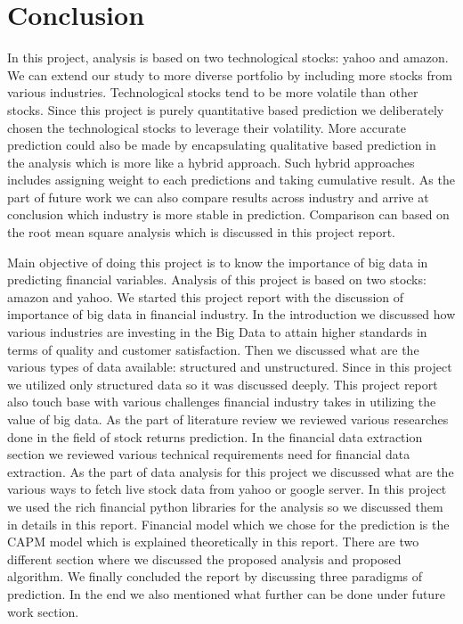 \section{Conclusion}
In this project, analysis is based on two technological stocks: yahoo and amazon. We can extend our study to more diverse portfolio by including more stocks 
from various industries. Technological stocks tend to be more volatile than other stocks. Since this project is purely quantitative based prediction we 
deliberately chosen the technological stocks to leverage their volatility. More accurate prediction could also be made by encapsulating qualitative based prediction
 in the analysis which is more like a hybrid approach. Such hybrid approaches includes assigning weight to each predictions and taking cumulative result.  
 As the part of future work we can also compare results across industry and arrive at conclusion which industry is more stable in prediction. Comparison can based on 
the root mean square analysis which is discussed in this project report.  


Main objective of doing this project is to know the importance of big data in predicting financial variables. Analysis of this project is based on two stocks:
amazon and yahoo. We started this project report with the discussion of importance of big data in financial industry. In the introduction we discussed how various
industries are investing in the Big Data to attain higher standards in terms of quality and customer satisfaction. Then we discussed what are the various types 
of data available: structured and unstructured. Since in this project we utilized only structured data so it was discussed deeply. This project report also touch base
with various challenges financial industry takes in utilizing the value of big data. As the part of literature review we reviewed various researches done in the field of 
stock returns prediction. In the financial data extraction section we reviewed various technical requirements need for financial data extraction. As the part 
of data analysis for this project we discussed what are the various ways to fetch live stock data from yahoo or google server. In this project  we used the 
rich financial python libraries for the analysis so we discussed them in details in this report.  Financial model which we chose for the prediction is the CAPM model which 
is explained theoretically in this report.  There are two different section where we discussed the proposed analysis and proposed algorithm. We finally concluded the 
report by discussing three paradigms of prediction. In the end we also mentioned what further can be done under future work section. 
 


